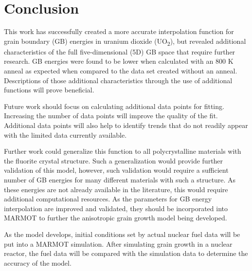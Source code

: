 \documentclass[12pt]{report}
\begin{document}
\chapter{Conclusion\label{conclusion}}
This work has successfully created a more accurate interpolation function for grain boundary (GB) energies in uranium dioxide (UO\textsubscript{2}), but revealed additional characteristics of the full five-dimensional (5D) GB space that require further research.  GB energies were found to be lower when calculated with an 800 K anneal as expected when compared to the data set created without an anneal.  Descriptions of those additional characteristics through the use of additional functions will prove beneficial.  

Future work should focus on calculating additional data points for fitting.  Increasing the number of data points will improve the quality of the fit.  Additional data points will also help to identify trends that do not readily appear with the limited data currently available. 

Further work could generalize this function to all polycrystalline materials with the fluorite crystal structure.  Such a generalization would provide further validation of this model, however, such validation would require a sufficient number of GB energies for many different materials with such a structure.  As these energies are not already available in the literature, this would require additional computational resources.  As the parameters for GB energy interpolation are improved and validated, they should be incorporated into MARMOT to further the anisotropic grain growth model being developed.

As the model develops, initial conditions set by actual nuclear fuel data will be put into a MARMOT simulation.  After simulating grain growth in a nuclear reactor, the fuel data will be compared with the simulation data to determine the accuracy of the model.
\end{document}
